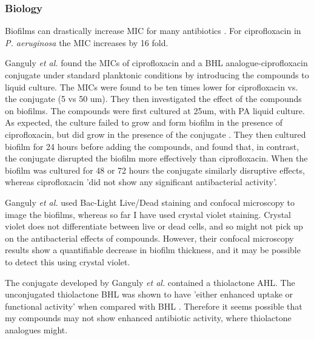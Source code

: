 \subsubsection{Biology}

Biofilms can drastically increase MIC for many antibiotics \cite{Ceri1999}. For ciprofloxacin in \textit{P. aeruginosa} the MIC increases by 16 fold. 

Ganguly \textit{et al.} \cite{Ganguly2011} found the MICs of ciprofloxacin and a BHL analogue-ciprofloxacin  conjugate under standard planktonic conditions by introducing the compounds to liquid culture. The MICs were found to be ten times lower for ciprofloxacin vs. the conjugate  (5 vs 50 um). They then investigated the effect of the compounds on biofilms. The compounds were first cultured at 25um, with PA liquid culture. As expected, the culture failed to grow and form biofilm in the presence of ciprofloxacin, but did grow in the presence of the conjugate . They then cultured biofilm for 24 hours before adding the compounds, and found that, in contrast, the conjugate  disrupted the biofilm more effectively than ciprofloxacin. When the biofilm was cultured for 48 or 72 hours the conjugate similarly disruptive effects, whereas ciprofloxacin 'did not show any significant antibacterial activity'.

Ganguly \textit{et al.} used Bac-Light Live/Dead staining and confocal microscopy to image the biofilms, whereas so far I have used crystal violet staining. Crystal violet does not differentiate between live or dead cells, and so might not pick up on the antibacterial effects of compounds. However, their confocal microscopy results show a quantifiable decrease in biofilm thickness, and it may be possible to detect this using crystal violet.

The conjugate  developed by Ganguly \textit{et al.} contained a thiolactone AHL. The unconjugated thiolactone BHL  was shown to have 'either enhanced uptake or functional activity' when compared with BHL . Therefore it seems possible that my compounds may not show enhanced antibiotic activity, where thiolactone analogues might.



